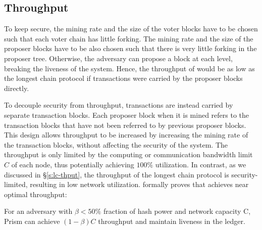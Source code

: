 \subsection{Throughput}
\label{sec:thruput}

To keep \prism secure, the mining rate and the size of the voter blocks have to be chosen such that each voter chain has little forking. The mining rate and the size of the proposer blocks have to be also chosen such that there is very little forking in the proposer tree. Otherwise, the adversary can propose a block at each level, breaking the liveness of the system. Hence, the throughput of \prism would be as low as the longest chain protocol if transactions were carried by the proposer blocks directly. 


To decouple security from throughput, transactions are instead carried by separate transaction blocks. Each proposer block when it is mined refers to the transaction blocks that have not been referred to by previous proposer blocks. This design allows throughput to be increased by increasing the mining rate of the transaction blocks, without affecting the security of the system. The throughput is only limited by the computing or communication bandwidth limit $C$ of each node, thus potentially achieving $100\%$ utilization. In contrast, as we discussed in \S\ref{s:lc-thput}, the throughput of the longest chain protocol is security-limited, resulting in low network utilization. \cite{prism-theory} formally proves that \prism achieves near optimal throughput:

\begin{theorem}
\label{thm:throughput} For an adversary with $\beta < 50\%$ fraction of hash power and network capacity C, Prism can achieve  $(1-\beta)C$ throughput and maintain liveness in the ledger.
\end{theorem}


